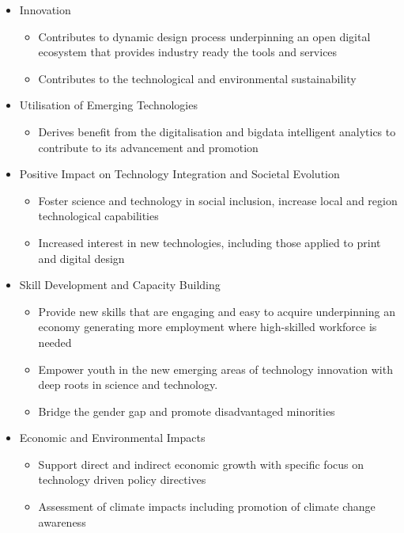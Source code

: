 \documentclass{ammTalk}
\begin{document}
\begin{itemize}\LARGE
 \item Innovation
       \begin{itemize}\Large
        \item Contributes to dynamic design process underpinning an open digital ecosystem that provides industry ready the tools and services
        \item Contributes to the technological and environmental  sustainability
       \end{itemize}

 \item Utilisation of Emerging Technologies
       \begin{itemize}\Large
        \item Derives benefit from the digitalisation and bigdata intelligent analytics to contribute to its advancement and promotion
       \end{itemize}

 \item Positive Impact on Technology Integration and Societal Evolution
       \begin{itemize}\Large
        \item Foster science and technology in social inclusion, increase local and region technological capabilities
        \item Increased interest in new technologies, including those applied to print and digital design
       \end{itemize}

 \item Skill Development and Capacity Building
       \begin{itemize}\Large
        \item Provide new skills that are engaging and easy to acquire underpinning an economy generating more employment where high-skilled workforce is needed
        \item Empower youth in the new emerging areas of technology innovation with deep roots in science and technology.
        \item Bridge the gender gap and promote disadvantaged minorities
       \end{itemize}

 \item Economic and Environmental Impacts
       \begin{itemize} \Large
        \item Support direct and indirect economic growth with specific focus on technology driven policy directives
        \item Assessment of climate impacts including promotion of climate change awareness
       \end{itemize}
\end{itemize}
\end{document}
